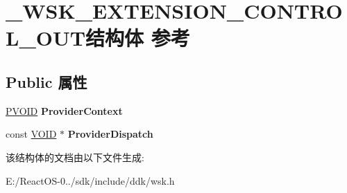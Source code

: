\hypertarget{struct___w_s_k___e_x_t_e_n_s_i_o_n___c_o_n_t_r_o_l___o_u_t}{}\section{\+\_\+\+W\+S\+K\+\_\+\+E\+X\+T\+E\+N\+S\+I\+O\+N\+\_\+\+C\+O\+N\+T\+R\+O\+L\+\_\+\+O\+U\+T结构体 参考}
\label{struct___w_s_k___e_x_t_e_n_s_i_o_n___c_o_n_t_r_o_l___o_u_t}
\subsection*{Public 属性}
\begin{DoxyCompactItemize}
\item 
\mbox{\label{struct___w_s_k___e_x_t_e_n_s_i_o_n___c_o_n_t_r_o_l___o_u_t_a83a117ffbd527339e8e309c57b986bbb}} 
\hyperlink{interfacevoid}{P\+V\+O\+ID} {\bfseries Provider\+Context}
\item 
\mbox{\label{struct___w_s_k___e_x_t_e_n_s_i_o_n___c_o_n_t_r_o_l___o_u_t_ad40e076aca86233e84fa6d0ff8909c95}} 
const \hyperlink{interfacevoid}{V\+O\+ID} $\ast$ {\bfseries Provider\+Dispatch}
\end{DoxyCompactItemize}


该结构体的文档由以下文件生成\+:\begin{DoxyCompactItemize}
\item 
E\+:/\+React\+O\+S-\/0../sdk/include/ddk/wsk.\+h\end{DoxyCompactItemize}
